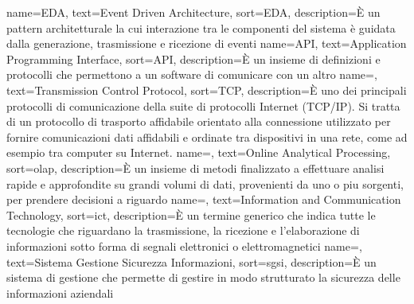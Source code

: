 {
    name={EDA},
    text=Event Driven Architecture,
    sort=EDA,
    description={È un pattern architetturale la cui interazione tra le componenti del sistema è guidata dalla generazione, trasmissione e ricezione di eventi}
}
{
    name={API},
    text=Application Programming Interface,
    sort=API,
    description={È un insieme di definizioni e protocolli che permettono a un software di comunicare con un altro}
}
 {
    name=,
    text=Transmission Control Protocol,
    sort=TCP,
    description={È uno dei principali protocolli di comunicazione della suite di protocolli Internet (TCP/IP). Si tratta di un protocollo di trasporto affidabile orientato alla connessione utilizzato per fornire comunicazioni dati affidabili e ordinate tra dispositivi in una rete, come ad esempio tra computer su Internet.}
}
 {
    name=,
    text=Online Analytical Processing,
    sort=olap,
    description={È un insieme di metodi finalizzato a effettuare analisi rapide e approfondite su grandi volumi di dati, provenienti da uno o piu sorgenti, per prendere decisioni a riguardo}
}
 {
    name=,
    text=Information and Communication Technology,
    sort=ict,
    description={È un termine generico che indica tutte le tecnologie che riguardano la trasmissione, la ricezione e l'elaborazione di informazioni sotto forma di segnali elettronici o elettromagnetici}
}
 {
    name=,
    text=Sistema Gestione Sicurezza Informazioni,
    sort=sgsi,
    description={È un sistema di gestione che permette di gestire in modo strutturato la sicurezza delle informazioni aziendali}
}

